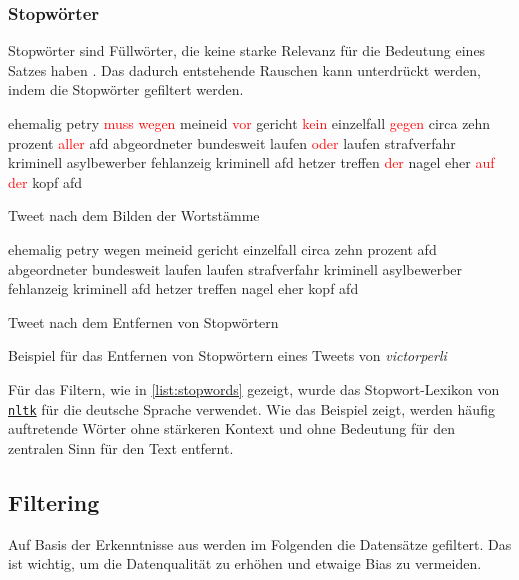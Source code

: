\subsubsection{Stopwörter}


Stopwörter sind Füllwörter, die keine starke Relevanz für die Bedeutung eines Satzes haben \autocite[4]{kowsari_text_2019}. Das dadurch entstehende Rauschen kann unterdrückt werden, indem die Stopwörter gefiltert werden.


\begin{code}[H]
    {\footnotesize
    \begin{subcode}{0.45\textwidth}
        ehemalig petry \textcolor{red}{muss wegen} meineid \textcolor{red}{vor} gericht \textcolor{red}{kein} einzelfall \textcolor{red}{gegen} circa zehn prozent \textcolor{red}{aller} afd abgeordneter bundesweit laufen \textcolor{red}{oder} laufen strafverfahr kriminell asylbewerber fehlanzeig kriminell afd hetzer treffen \textcolor{red}{der} nagel eher \textcolor{red}{auf der} kopf afd
        \caption{Tweet nach dem Bilden der Wortstämme}
    \end{subcode}\hfill
    \begin{subcode}{0.45\textwidth}
        ehemalig petry wegen meineid gericht einzelfall circa zehn prozent afd abgeordneter bundesweit laufen laufen strafverfahr kriminell asylbewerber fehlanzeig kriminell afd hetzer treffen nagel eher kopf afd
        \caption{Tweet nach dem Entfernen von Stopwörtern}
    \end{subcode}\hfill
    }
    \caption[Beispiel -- Entfernen von Stopwörtern]{Beispiel für das Entfernen von Stopwörtern eines Tweets von \textit{victorperli}} \label{list:stopwords}
\end{code}

Für das Filtern, wie in \autoref{list:stopwords} gezeigt, wurde das Stopwort-Lexikon von \href{https://www.nltk.org/}{\texttt{nltk}} für die deutsche Sprache verwendet. Wie das Beispiel zeigt, werden häufig auftretende Wörter ohne stärkeren Kontext und ohne Bedeutung für den zentralen Sinn für den Text entfernt.

\subsection{Filtering} \label{subsec:filtering}

Auf Basis der Erkenntnisse aus  werden im Folgenden die Datensätze gefiltert. Das ist wichtig, um die Datenqualität zu erhöhen und etwaige Bias zu vermeiden.


